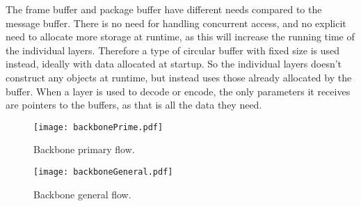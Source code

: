 The frame buffer and package buffer have different needs compared to the message buffer. There is no need for handling concurrent access, and no explicit need to allocate more storage at runtime, as this will increase the running time of the individual layers.
Therefore a type of circular buffer with fixed size is used instead, ideally with data allocated at startup. So the individual layers doesn't construct any objects at runtime, but instead uses those already allocated by the buffer.
When a layer is used to decode or encode, the only parameters it receives are pointers to the buffers, as that is all the data they need.

\begin{figure}[htb]
	\begin{center}
	\texttt{[image: backbonePrime.pdf]}
	\caption{Backbone primary flow.}	

	\label{fig:backboneprime}	
	\end{center}
\end{figure}

\begin{figure}[htb]
	\begin{center}
	\texttt{[image: backboneGeneral.pdf]}
	\caption{Backbone general flow.}
	\label{fig:backbonegeneral}	
	\end{center}
\end{figure}
